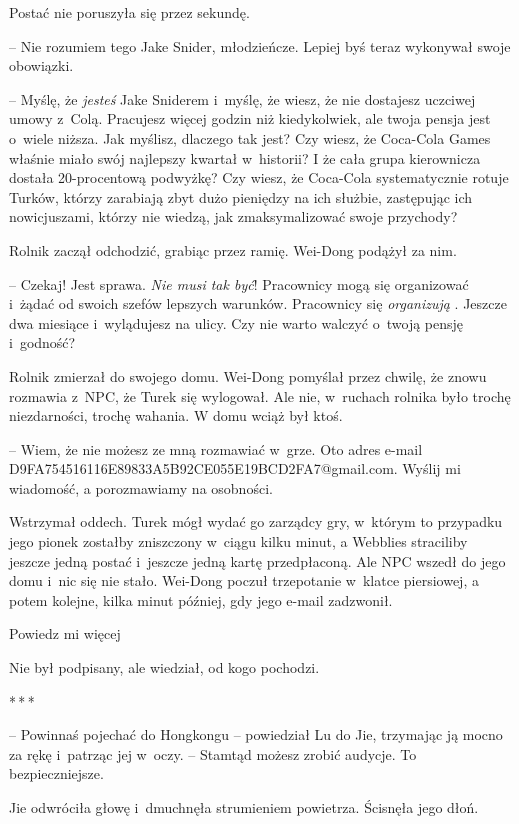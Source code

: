 \documentclass[oneside,polish,11pt,rmheadings]{mwbk}
\newcommand{\threeast}{\par\centerline{*\,*\,*}\medskip\par}
\begin{document}
Postać nie poruszyła się przez sekundę. 

-- Nie rozumiem tego Jake Snider, młodzieńcze. Lepiej byś teraz wykonywał swoje obowiązki.

-- Myślę, że \textit{jesteś }Jake Sniderem i~myślę, że wiesz, że nie dostajesz uczciwej umowy z~Colą. Pracujesz więcej godzin niż kiedykolwiek, ale twoja pensja jest o~wiele niższa. Jak myślisz, dlaczego tak jest? Czy wiesz, że Coca-Cola Games właśnie miało swój najlepszy kwartał w~historii? I że cała grupa kierownicza dostała 20-procentową podwyżkę? Czy wiesz, że Coca-Cola systematycznie rotuje Turków, którzy zarabiają zbyt dużo pieniędzy na ich służbie, zastępując ich nowicjuszami, którzy nie wiedzą, jak zmaksymalizować swoje przychody?

Rolnik zaczął odchodzić, grabiąc przez ramię. Wei-Dong podążył za nim.

-- Czekaj! Jest sprawa. \textit{Nie musi tak być}! Pracownicy mogą się organizować i~żądać od swoich szefów lepszych warunków. Pracownicy się \textit{organizują }. Jeszcze dwa miesiące i~wylądujesz na ulicy. Czy nie warto walczyć o~twoją pensję i~godność?

Rolnik zmierzał do swojego domu. Wei-Dong pomyślał przez chwilę, że znowu rozmawia z~NPC, że Turek się wylogował. Ale nie, w~ruchach rolnika było trochę niezdarności, trochę wahania. W domu wciąż był ktoś. 

-- Wiem, że nie możesz ze mną rozmawiać w~grze. Oto adres e-mail D9FA754516116E89833A5B92CE055E19BCD2FA7@gmail.com. Wyślij mi wiadomość, a porozmawiamy na osobności.

Wstrzymał oddech. Turek mógł wydać go zarządcy gry, w~którym to przypadku jego pionek zostałby zniszczony w~ciągu kilku minut, a Webblies straciliby jeszcze jedną postać i~jeszcze jedną kartę przedpłaconą. Ale NPC wszedł do jego domu i~nic się nie stało. Wei-Dong poczuł trzepotanie w~klatce piersiowej, a potem kolejne, kilka minut później, gdy jego e-mail zadzwonił.

\noindent {\textgreater} Powiedz mi więcej

Nie był podpisany, ale wiedział, od kogo pochodzi.

\bigskip
\threeast

-- Powinnaś pojechać do Hongkongu -- powiedział Lu do Jie, trzymając ją mocno za rękę i~patrząc jej w~oczy. -- Stamtąd możesz zrobić audycje. To bezpieczniejsze.

Jie odwróciła głowę i~dmuchnęła strumieniem powietrza. Ścisnęła jego dłoń. 
\end{document}
